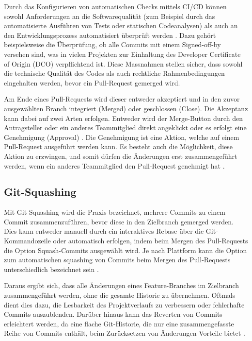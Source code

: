 Durch das Konfigurieren von automatischen Checks mittels CI/CD können sowohl Anforderungen an die Softwarequalität (zum Beispiel durch das automatisierte Ausführen von Tests oder statischen Codeanalysen) als auch an den Entwicklungsprozess automatisiert überprüft werden \parencite{kinsman_how_2021}. Dazu gehört beispielsweise die Überprüfung, ob alle Commits mit einem Signed-off-by versehen sind, was in vielen Projekten zur Einhaltung des Developer Certificate of Origin (DCO) verpflichtend ist. Diese Massnahmen stellen sicher, dass sowohl die technische Qualität des Codes als auch rechtliche Rahmenbedingungen eingehalten werden, bevor ein Pull-Request gemerged wird. \parencite{holtgrave_attributing_2025} 

Am Ende eines Pull-Requests wird dieser entweder akzeptiert und in den zuvor ausgewählten Branch integriert (Merged) oder geschlossen (Close)\parencite{noauthor_merging_nodate}\parencite{noauthor_closing_nodate}. Die Akzeptanz kann dabei auf zwei Arten erfolgen. Entweder wird der Merge-Button durch den Antragsteller oder ein anderes Teammitglied direkt angeklickt oder es erfolgt eine Genehmigung (Approval) \parencite{noauthor_merging_nodate}\parencite{noauthor_reviewing_nodate}. Die Genehmigung ist eine Aktion, welche auf einem Pull-Request ausgeführt werden kann. Es besteht auch die Möglichkeit, diese Aktion zu erzwingen, und somit dürfen die Änderungen erst zusammengeführt werden, wenn ein anderes Teammitglied den Pull-Request genehmigt hat \parencite{noauthor_approving_nodate}.

\subsection{Git-Squashing}
\label{sec:GitSquashing}
Mit Git-Squashing wird die Praxis bezeichnet, mehrere Commits zu einem Commit zusammenzuführen, bevor diese in den Zielbranch gemerged werden. Dies kann entweder manuell durch ein interaktives Rebase über die Git-Kommandozeile oder automatisch erfolgen, indem beim Mergen des Pull-Requests die Option Squash-Commits ausgewählt wird. Je nach Plattform kann die Option zum automatischen squashing von Commits beim Mergen des Pull-Requests unterschiedlich bezeichnet sein \parencite{noauthor_about_nodate}\parencite{noauthor_squash_nodate}. \parencite{noauthor_git_nodate} 

Daraus ergibt sich, dass alle Änderungen eines Feature-Branches im Zielbranch zusammengeführt werden, ohne die gesamte Historie zu übernehmen. Oftmals dient dies dazu, die Lesbarkeit des Projektverlaufs zu verbessern oder fehlerhafte Commits auszublenden. Darüber hinaus kann das Reverten von Commits erleichtert werden, da eine flache Git-Historie, die nur eine zusammengefasste Reihe von Commits enthält, beim Zurücksetzen von Änderungen Vorteile bietet \parencite{just_switching_2016}. \parencite{codoban_comparative_2015}

